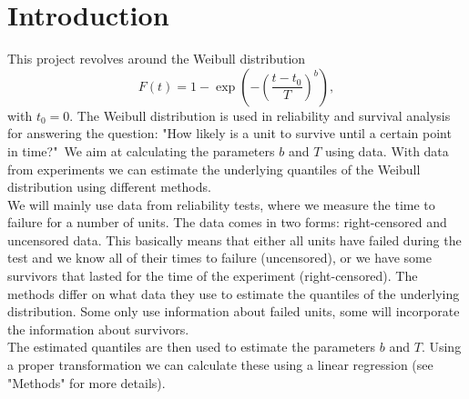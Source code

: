 \section{Introduction}

This project revolves around the Weibull distribution
$$ F(t) = 1 - \exp\left(- \left( \frac{t - t_0}{T}\right)^b\right), $$
with $t_0 = 0$. The Weibull distribution is used in reliability and survival analysis for answering the question: "How likely is a unit to survive until a certain point in time?"\ We aim at calculating the parameters $b$ and $T$ using data. With data from experiments 
we can estimate the underlying quantiles of the Weibull distribution using different methods.\\
We will mainly use data from reliability tests, where we measure the time to failure for a number of units. The data comes in two forms: right-censored and uncensored data. This basically means that either all units have failed during the test and we know all of their times to failure (uncensored), or we have some survivors that lasted for the time of the experiment (right-censored). The methods differ on what data they use to estimate the quantiles of the underlying distribution. Some only use information about failed units, some will incorporate the information about survivors.\\
The estimated quantiles are then used to estimate the parameters $b$ and $T$. Using a proper transformation we can calculate these using a linear regression (see "Methods" for more details).